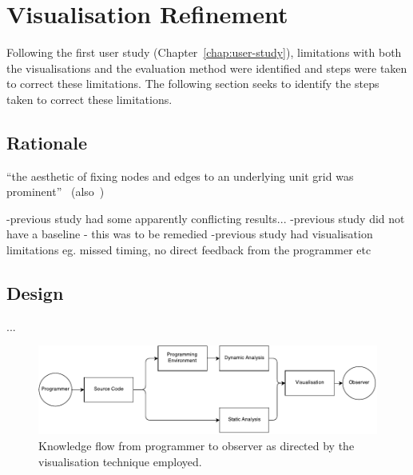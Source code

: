 
\chapter{Visualisation Refinement}
\label{chap:visualisation-refinement}

Following the first user study (Chapter~\ref{chap:user-study}), limitations with both the visualisations and the evaluation method were identified and steps were taken to correct these limitations. The following section seeks to identify the steps taken to correct these limitations.

\section{Rationale}


``the aesthetic of fixing nodes and edges to an underlying unit grid was prominent''~\cite{Purchase2014} (also~\cite{Purchase2001,Purchase1996})

-previous study had some apparently conflicting results...
-previous study did not have a baseline - this was to be remedied
-previous study had visualisation limitations eg. missed timing, no direct feedback from the programmer etc


\section{Design}

\cite{Purchase1996}...

\begin{figure}
  \centering \includegraphics[width=\columnwidth]{../images/diagrams/knowledge-flow-refined.pdf}
  \caption{Knowledge flow from programmer to observer as directed by the visualisation technique employed.}
\label{fig:knowledge-flow-refined}
\end{figure}

